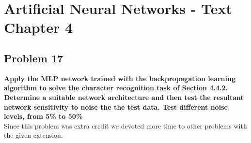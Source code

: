 \chapter{Artificial Neural Networks - Text Chapter 4}

\section{Problem 17}

\textbf{Apply the MLP network trained with the backpropagation learning algorithm to solve the character recognition task of Section 4.4.2.} \newline \\
\textbf{Determine a suitable network architecture and then test the resultant network sensitivity to noise the the test data. Test different noise levels, from 5\% to 50\%} \newline \\

Since this problem was extra credit we devoted more time to other problems with the given extension.